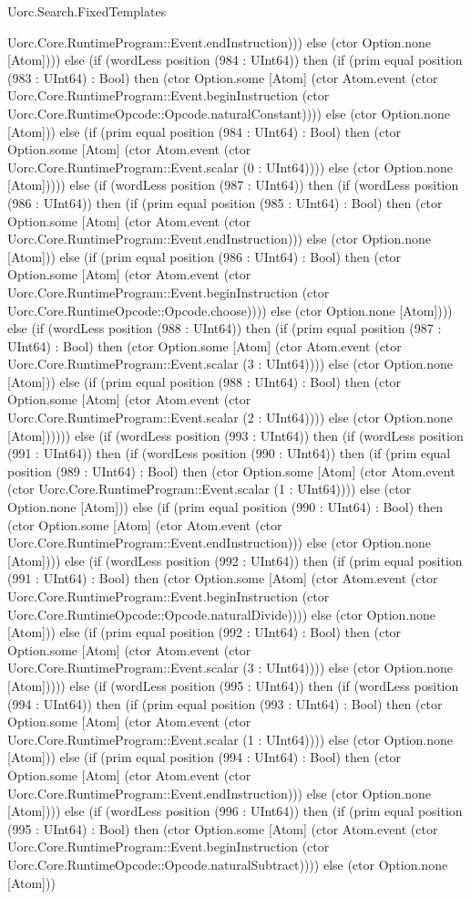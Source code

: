 \begin{lexlean}{Uorc.Search.FixedTemplates}
\begin{semanticmodule}
{Uorc.Core.RuntimeProgram::Event.endInstruction))) else (ctor Option.none [Atom]))) else (if (wordLess position (984 : UInt64)) then (if (prim equal position (983 : UInt64) : Bool) then (ctor Option.some [Atom] (ctor Atom.event (ctor Uorc.Core.RuntimeProgram::Event.beginInstruction (ctor Uorc.Core.RuntimeOpcode::Opcode.naturalConstant)))) else (ctor Option.none [Atom])) else (if (prim equal position (984 : UInt64) : Bool) then (ctor Option.some [Atom] (ctor Atom.event (ctor Uorc.Core.RuntimeProgram::Event.scalar (0 : UInt64)))) else (ctor Option.none [Atom])))) else (if (wordLess position (987 : UInt64)) then (if (wordLess position (986 : UInt64)) then (if (prim equal position (985 : UInt64) : Bool) then (ctor Option.some [Atom] (ctor Atom.event (ctor Uorc.Core.RuntimeProgram::Event.endInstruction))) else (ctor Option.none [Atom])) else (if (prim equal position (986 : UInt64) : Bool) then (ctor Option.some [Atom] (ctor Atom.event (ctor Uorc.Core.RuntimeProgram::Event.beginInstruction (ctor Uorc.Core.RuntimeOpcode::Opcode.choose)))) else (ctor Option.none [Atom]))) else (if (wordLess position (988 : UInt64)) then (if (prim equal position (987 : UInt64) : Bool) then (ctor Option.some [Atom] (ctor Atom.event (ctor Uorc.Core.RuntimeProgram::Event.scalar (3 : UInt64)))) else (ctor Option.none [Atom])) else (if (prim equal position (988 : UInt64) : Bool) then (ctor Option.some [Atom] (ctor Atom.event (ctor Uorc.Core.RuntimeProgram::Event.scalar (2 : UInt64)))) else (ctor Option.none [Atom]))))) else (if (wordLess position (993 : UInt64)) then (if (wordLess position (991 : UInt64)) then (if (wordLess position (990 : UInt64)) then (if (prim equal position (989 : UInt64) : Bool) then (ctor Option.some [Atom] (ctor Atom.event (ctor Uorc.Core.RuntimeProgram::Event.scalar (1 : UInt64)))) else (ctor Option.none [Atom])) else (if (prim equal position (990 : UInt64) : Bool) then (ctor Option.some [Atom] (ctor Atom.event (ctor Uorc.Core.RuntimeProgram::Event.endInstruction))) else (ctor Option.none [Atom]))) else (if (wordLess position (992 : UInt64)) then (if (prim equal position (991 : UInt64) : Bool) then (ctor Option.some [Atom] (ctor Atom.event (ctor Uorc.Core.RuntimeProgram::Event.beginInstruction (ctor Uorc.Core.RuntimeOpcode::Opcode.naturalDivide)))) else (ctor Option.none [Atom])) else (if (prim equal position (992 : UInt64) : Bool) then (ctor Option.some [Atom] (ctor Atom.event (ctor Uorc.Core.RuntimeProgram::Event.scalar (3 : UInt64)))) else (ctor Option.none [Atom])))) else (if (wordLess position (995 : UInt64)) then (if (wordLess position (994 : UInt64)) then (if (prim equal position (993 : UInt64) : Bool) then (ctor Option.some [Atom] (ctor Atom.event (ctor Uorc.Core.RuntimeProgram::Event.scalar (1 : UInt64)))) else (ctor Option.none [Atom])) else (if (prim equal position (994 : UInt64) : Bool) then (ctor Option.some [Atom] (ctor Atom.event (ctor Uorc.Core.RuntimeProgram::Event.endInstruction))) else (ctor Option.none [Atom]))) else (if (wordLess position (996 : UInt64)) then (if (prim equal position (995 : UInt64) : Bool) then (ctor Option.some [Atom] (ctor Atom.event (ctor Uorc.Core.RuntimeProgram::Event.beginInstruction (ctor Uorc.Core.RuntimeOpcode::Opcode.naturalSubtract)))) else (ctor Option.none [Atom])) }
\end{semanticmodule}
\end{lexlean}
